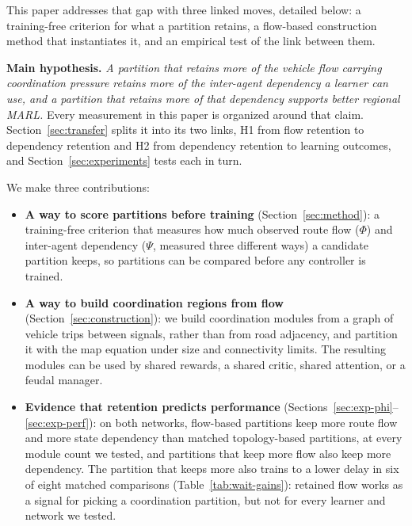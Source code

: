 \documentclass[journal]{IEEEtran}
\theoremstyle{definition}
\begin{document}
This paper addresses that gap with three linked moves, detailed below: a training-free criterion for what a partition retains, a flow-based construction method that instantiates it, and an empirical test of the link between them.

\noindent\textbf{Main hypothesis.}
\emph{A partition that retains more of the vehicle flow carrying coordination pressure retains more of the inter-agent dependency a learner can use, and a partition that retains more of that dependency supports better regional MARL.}
Every measurement in this paper is organized around that claim. Section~\ref{sec:transfer} splits it into its two links, H1 from flow retention to dependency retention and H2 from dependency retention to learning outcomes, and Section~\ref{sec:experiments} tests each in turn.

We make three contributions:
\begin{itemize}
    \item \textbf{A way to score partitions before training}
          (Section~\ref{sec:method}): a training-free criterion that
          measures how much observed route flow ($\Phi$) and inter-agent
          dependency ($\Psi$, measured three different ways) a candidate
          partition keeps, so partitions can be compared before any
          controller is trained.
    \item \textbf{A way to build coordination regions from flow}
          (Section~\ref{sec:construction}): we build coordination modules
          from a graph of vehicle trips between signals, rather than from
          road adjacency, and partition it with the map equation under
          size and connectivity limits. The resulting modules can be used
          by shared rewards, a shared critic, shared attention, or a
          feudal manager.
    \item \textbf{Evidence that retention predicts performance}
          (Sections~\ref{sec:exp-phi}--\ref{sec:exp-perf}): on both
          networks, flow-based partitions keep more route flow and more
          state dependency than matched topology-based partitions, at
          every module count we tested, and partitions that keep more
          flow also keep more dependency. The partition that keeps more
          also trains to a lower delay in six of eight matched comparisons
          (Table~\ref{tab:wait-gains}): retained flow works as a signal
          for picking a coordination partition, but not for every learner
          and network we tested.
\end{itemize}
\end{document}
